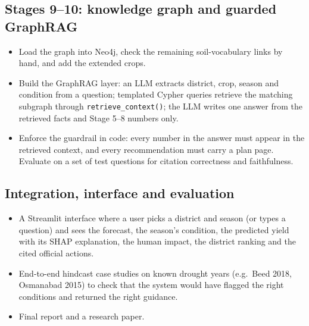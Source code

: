 \subsection{Stages 9--10: knowledge graph and guarded GraphRAG}
\begin{itemize}
	\item Load the graph into Neo4j, check the remaining soil-vocabulary links by hand, and add the extended crops.
	\item Build the GraphRAG layer: an LLM extracts district, crop, season and condition from a question; templated Cypher queries retrieve the matching subgraph through \texttt{retrieve\_context()}; the LLM writes one answer from the retrieved facts and Stage 5--8 numbers only.
	\item Enforce the guardrail in code: every number in the answer must appear in the retrieved context, and every recommendation must carry a plan page. Evaluate on a set of test questions for citation correctness and faithfulness.
\end{itemize}

\subsection{Integration, interface and evaluation}
\begin{itemize}
	\item A Streamlit interface where a user picks a district and season (or types a question) and sees the forecast, the season's condition, the predicted yield with its SHAP explanation, the human impact, the district ranking and the cited official actions.
	\item End-to-end hindcast case studies on known drought years (e.g.\ Beed 2018, Osmanabad 2015) to check that the system would have flagged the right conditions and returned the right guidance.
	\item Final report and a research paper.
\end{itemize}

